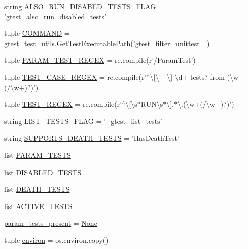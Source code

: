 \begin{DoxyCompactItemize}
\item 
string \hyperlink{namespacegtest__filter__unittest_aa2da713fbaa08fdbaa7cd78c45974edf}{A\-L\-S\-O\-\_\-\-R\-U\-N\-\_\-\-D\-I\-S\-A\-B\-E\-D\-\_\-\-T\-E\-S\-T\-S\-\_\-\-F\-L\-A\-G} = 'gtest\-\_\-also\-\_\-run\-\_\-disabled\-\_\-tests'
\item 
tuple \hyperlink{namespacegtest__filter__unittest_a37a3f33245e16e9733ae3568e623b837}{C\-O\-M\-M\-A\-N\-D} = \hyperlink{namespacegtest__test__utils_a1bdf3cac86afa675ed37629b183048e9}{gtest\-\_\-test\-\_\-utils.\-Get\-Test\-Executable\-Path}('gtest\-\_\-filter\-\_\-unittest\-\_\-')
\item 
tuple \hyperlink{namespacegtest__filter__unittest_a6354bb68724bdd8c64b95b8c3c863ba4}{P\-A\-R\-A\-M\-\_\-\-T\-E\-S\-T\-\_\-\-R\-E\-G\-E\-X} = re.\-compile(r'/Param\-Test')
\item 
tuple \hyperlink{namespacegtest__filter__unittest_a25a06e9972778e27d6868f141a1e3c3f}{T\-E\-S\-T\-\_\-\-C\-A\-S\-E\-\_\-\-R\-E\-G\-E\-X} = re.\-compile(r'$^\wedge$\textbackslash{}\mbox{[}\textbackslash{}-\/+\textbackslash{}\mbox{]} \textbackslash{}d+ tests? from (\textbackslash{}w+(/\textbackslash{}w+)?)')
\item 
tuple \hyperlink{namespacegtest__filter__unittest_a4f2249fe4f1b7360c2fe2304a81f9e51}{T\-E\-S\-T\-\_\-\-R\-E\-G\-E\-X} = re.\-compile(r'$^\wedge$\textbackslash{}\mbox{[}\textbackslash{}s$\ast$R\-U\-N\textbackslash{}s$\ast$\textbackslash{}\mbox{]}.$\ast$\textbackslash{}.(\textbackslash{}w+(/\textbackslash{}w+)?)')
\item 
string \hyperlink{namespacegtest__filter__unittest_a9b3bb8eda9c6b1716e992d433b1e586c}{L\-I\-S\-T\-\_\-\-T\-E\-S\-T\-S\-\_\-\-F\-L\-A\-G} = '-\/-\/gtest\-\_\-list\-\_\-tests'
\item 
string \hyperlink{namespacegtest__filter__unittest_a660f467579ec78f8f856b588c6f6f270}{S\-U\-P\-P\-O\-R\-T\-S\-\_\-\-D\-E\-A\-T\-H\-\_\-\-T\-E\-S\-T\-S} = 'Has\-Death\-Test'
\item 
list \hyperlink{namespacegtest__filter__unittest_a4c414863f1e2e9ac993ce4afda33f6b9}{P\-A\-R\-A\-M\-\_\-\-T\-E\-S\-T\-S}
\item 
list \hyperlink{namespacegtest__filter__unittest_affe760ab1e8c4c7b61566076c37c1d69}{D\-I\-S\-A\-B\-L\-E\-D\-\_\-\-T\-E\-S\-T\-S}
\item 
list \hyperlink{namespacegtest__filter__unittest_ab14d082dc05c07458595606a64616d0b}{D\-E\-A\-T\-H\-\_\-\-T\-E\-S\-T\-S}
\item 
list \hyperlink{namespacegtest__filter__unittest_a8eb26cb0e0ac81737723cc9d16e1d253}{A\-C\-T\-I\-V\-E\-\_\-\-T\-E\-S\-T\-S}
\item 
\hyperlink{namespacegtest__filter__unittest_aab31f58fd88fa64c14e6ab5dc5fb8da3}{param\-\_\-tests\-\_\-present} = \hyperlink{class_none}{None}
\item 
tuple \hyperlink{namespacegtest__filter__unittest_a39a358caaa1ecaa4f0403093c48f08ee}{environ} = os.\-environ.\-copy()
\end{DoxyCompactItemize}


